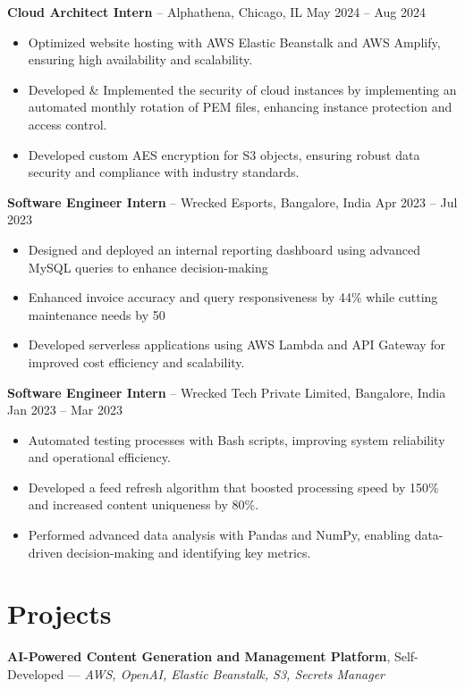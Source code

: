 \documentclass[10pt, letterpaper]{article}
\begin{document}
\textbf{\textcolor{myBlue}{Cloud Architect Intern}} -- Alphathena, Chicago, IL \hfill May 2024 -- Aug 2024
\begin{itemize}[leftmargin=*]
    \item Optimized website hosting with AWS Elastic Beanstalk and AWS Amplify, ensuring high availability and scalability.
    \item Developed \& Implemented the security of cloud instances by implementing an automated monthly rotation of PEM files, enhancing instance protection and access control.
    \item Developed custom AES encryption for S3 objects, ensuring robust data security and compliance with industry standards.
\end{itemize}

\textbf{\textcolor{myBlue}{Software Engineer Intern}} -- Wrecked Esports, Bangalore, India \hfill Apr 2023 -- Jul 2023
\begin{itemize}[leftmargin=*]
    \item Designed and deployed an internal reporting dashboard using advanced MySQL queries to enhance decision-making
    \item Enhanced invoice accuracy and query responsiveness by 44\% while cutting maintenance needs by 50%
    \item Developed serverless applications using AWS Lambda and API Gateway for improved cost efficiency and scalability.
\end{itemize}


\textbf{\textcolor{myBlue}{Software Engineer Intern}} -- Wrecked Tech Private Limited, Bangalore, India \hfill Jan 2023 -- Mar 2023
\begin{itemize}[leftmargin=*]
    \item Automated testing processes with Bash scripts, improving system reliability and operational efficiency.
    \item Developed a feed refresh algorithm that boosted processing speed by 150\% and increased content uniqueness by 80\%.
    \item Performed advanced data analysis with Pandas and NumPy, enabling data-driven decision-making and identifying key metrics.
\end{itemize}

\vspace{0.2cm}

\section{Projects}
\textbf{AI-Powered Content Generation and Management Platform}, Self-Developed — \textit{AWS, OpenAI, Elastic Beanstalk, S3, Secrets Manager}
\end{document}
